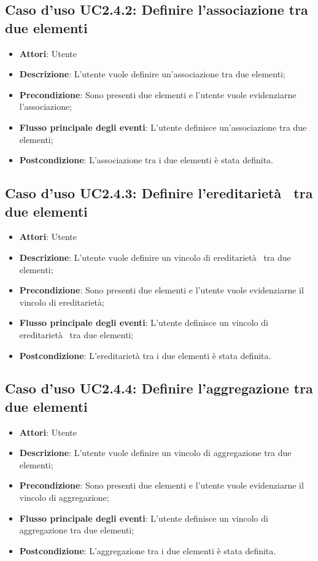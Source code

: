 \documentclass[../AnalisiDeiRequisiti.tex]{subfiles}
\begin{document}
		\subsection{Caso d'uso UC2.4.2: Definire l'associazione tra due elementi}
		\begin{itemize}
			\item \textbf{Attori}: Utente
			\item \textbf{Descrizione}: L'utente vuole definire un'associazione tra due elementi;
			\item \textbf{Precondizione}: Sono presenti due elementi e l'utente vuole evidenziarne l'associazione;
			\item \textbf{Flusso principale degli eventi}: L'utente definisce un'associazione tra due elementi;
			\item \textbf{Postcondizione}: L'associazione tra i due elementi è stata definita.
		\end{itemize}
		\subsection{Caso d'uso UC2.4.3: Definire l'ereditarietà  tra due elementi}
		\begin{itemize}
			\item \textbf{Attori}: Utente
			\item \textbf{Descrizione}: L'utente vuole definire un vincolo di ereditarietà  tra due elementi;
			\item \textbf{Precondizione}: Sono presenti due elementi e l'utente vuole evidenziarne il vincolo di ereditarietà;
			\item \textbf{Flusso principale degli eventi}: L'utente definisce un vincolo di ereditarietà  tra due elementi;
			\item \textbf{Postcondizione}: L'ereditarietà tra i due elementi è stata definita.
		\end{itemize}
		\subsection{Caso d'uso UC2.4.4: Definire l'aggregazione tra due elementi}
		\begin{itemize}
			\item \textbf{Attori}: Utente
			\item \textbf{Descrizione}: L'utente vuole definire un vincolo di aggregazione tra due elementi;
			\item \textbf{Precondizione}: Sono presenti due elementi e l'utente vuole evidenziarne il vincolo di aggregazione;
			\item \textbf{Flusso principale degli eventi}: L'utente definisce un vincolo di aggregazione tra due elementi;
			\item \textbf{Postcondizione}: L'aggregazione tra i due elementi è stata definita.
		\end{itemize}
\end{document}
